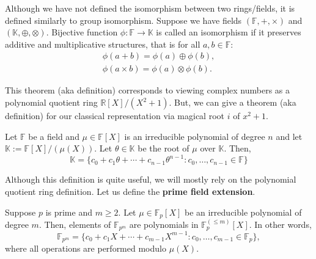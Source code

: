 \documentclass[../lecture-notes.tex]{subfiles}
\begin{document}
\begin{remark}
    Although we have not defined the isomorphism between two rings/fields, it is defined similarly to group isomorphism. Suppose we have fields $(\mathbb{F},+,\times)$ and $(\mathbb{K}, \oplus, \otimes)$. Bijective function $\phi: \mathbb{F} \to \mathbb{K}$ is called an isomorphism if it preserves additive and multiplicative structures, that is for all $a,b \in \mathbb{F}$:
    \begin{equation}
        \begin{aligned}
            \phi(a+b) = \phi(a) \oplus \phi(b),\\
            \phi(a\times b) = \phi(a) \otimes \phi(b).
        \end{aligned}
    \end{equation}
\end{remark}

This theorem (aka definition) corresponds to viewing complex numbers as a polynomial quotient ring $\mathbb{R}[X]/(X^2+1)$. But, we can give a theorem (aka definition) for our classical representation via magical root $i$ of $x^2+1$.

\begin{theorem}
    Let $\mathbb{F}$ be a field and $\mu \in \mathbb{F}[X]$ is an irreducible polynomial of degree $n$ and let $\mathbb{K} := \mathbb{F}[X]/(\mu(X))$. Let $\theta \in \mathbb{K}$ be the root of $\mu$ over $\mathbb{K}$. Then,
    \begin{equation}
        \mathbb{K} = \{c_0+c_1\theta+\cdots+c_{n-1}\theta^{n-1}: c_0,\dots,c_{n-1} \in \mathbb{F}\}
    \end{equation}
\end{theorem}

Although this definition is quite useful, we will mostly rely on the polynomial quotient ring definition. Let us define the \textbf{prime field extension}.

\begin{definition}
    Suppose $p$ is prime and $m \geq 2$. Let $\mu \in \mathbb{F}_p[X]$ be an irreducible polynomial of degree $m$. Then, elements of $\mathbb{F}_{p^m}$ are polynomials in $\mathbb{F}_p^{(\leq m)}[X]$. In other words,
    \begin{equation}
        \mathbb{F}_{p^m} = \{c_0+c_1X+\cdots+c_{m-1}X^{m-1}: c_0,\dots,c_{m-1} \in \mathbb{F}_p\},
    \end{equation}
    where all operations are performed modulo $\mu(X)$.
\end{definition}
\end{document}
